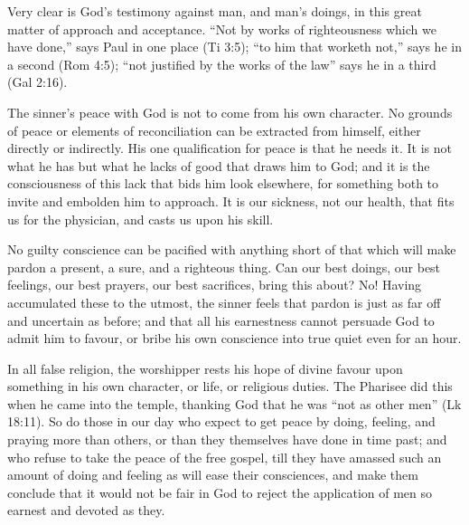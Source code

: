 \documentclass[
]{book}
\begin{document}
Very clear is God's testimony against man, and man's doings, in this great matter of approach and acceptance. ``Not by works of righteousness which we have done,'' says Paul in one place (Ti 3:5); ``to him that worketh not,'' says he in a second (Rom 4:5); ``not justified by the works of the law'' says he in a third (Gal 2:16).

The sinner's peace with God is not to come from his own character. No grounds of peace or elements of reconciliation can be extracted from himself, either directly or indirectly. His one qualification for peace is that he needs it. It is not what he has but what he lacks of good that draws him to God; and it is the consciousness of this lack that bids him look elsewhere, for something both to invite and embolden him to approach. It is our sickness, not our health, that fits us for the physician, and casts us upon his skill.

No guilty conscience can be pacified with anything short of that which will make pardon a present, a sure, and a righteous thing. Can our best doings, our best feelings, our best prayers, our best sacrifices, bring this about? No! Having accumulated these to the utmost, the sinner feels that pardon is just as far off and uncertain as before; and that all his earnestness cannot persuade God to admit him to favour, or bribe his own conscience into true quiet even for an hour.

In all false religion, the worshipper rests his hope of divine favour upon something in his own character, or life, or religious duties. The Pharisee did this when he came into the temple, thanking God that he was ``not as other men'' (Lk 18:11). So do those in our day who expect to get peace by doing, feeling, and praying more than others, or than they themselves have done in time past; and who refuse to take the peace of the free gospel, till they have amassed such an amount of doing and feeling as will ease their consciences, and make them conclude that it would not be fair in God to reject the application of men so earnest and devoted as they.
\end{document}
